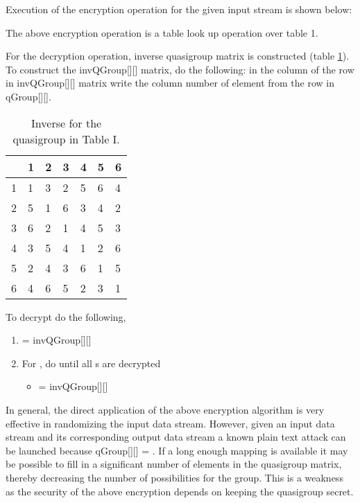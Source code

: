 \documentclass[conference]{IEEEtran}
\begin{document}
Execution of the encryption operation for the given input stream is shown below:


The above encryption operation is a table look up operation over table 1.

For the decryption operation, inverse quasigroup matrix is constructed (table \ref{tab:inverseQG}). To construct the invQGroup[][] matrix, do the following: in the  column of the  row in invQGroup[][] matrix write the column number of element  from the  row in qGroup[][].

\begin{table}
\centering
\begin{tabular}{|r|l|l|l|l|l|l|}
\hline
& 1&  2&  3&  4&  5&  6\\ \hline
1& 1&  3&  2&  5&  6&  4\\ \hline
2& 5&  1&  6&  3&  4&  2\\ \hline
3& 6&  2&  1&  4&  5&  3\\ \hline
4& 3&  5&  4&  1&  2&  6\\ \hline
5& 2&  4&  3&  6&  1&  5\\ \hline
6& 4&  6&  5&  2&  3&  1\\ \hline
\end{tabular}
\caption{Inverse for the quasigroup in Table I.}
\vspace{-0.28in}
\label{tab:inverseQG}
\end{table}

To decrypt do the following,
\begin{enumerate}
  \item  = invQGroup[][]
  \item For , do until all s are decrypted
  \begin{itemize}
    \item  = invQGroup[][]
  \end{itemize}
\end{enumerate}

In general, the direct application of the above encryption algorithm is very effective in randomizing the input data stream. However, given an input data stream and its corresponding output data stream a known plain text attack can be launched because qGroup[][] = . If a long enough mapping is available it may be possible to fill in a significant number of elements in the quasigroup matrix, thereby decreasing the number of possibilities for the group. This is a weakness as the security of the above encryption depends on keeping the quasigroup secret.
\end{document}

